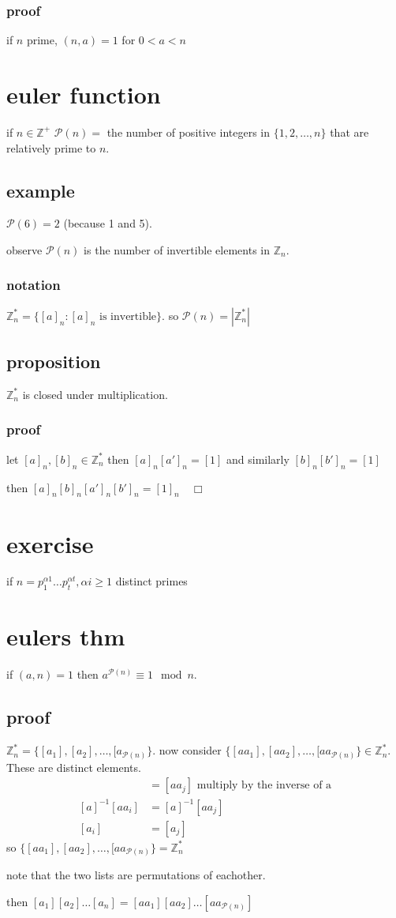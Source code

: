 \documentclass[letterpaper]{article}
\begin{document}
\subsubsection*{proof}
if $n$ prime, $(n,a)=1$ for $0<a<n$
\section*{euler function}
if $n\in\mathbb{Z}^+$ $\mathcal{P}(n)=$ the number of positive integers in $\{1,2,\dots,n\}$ that are relatively prime to $n$.
\subsection*{example}
$\mathcal{P}(6)=2$ (because 1 and 5).

observe $\mathcal{P}(n)$ is the number of invertible elements in $\mathbb{Z}_n$.
\subsubsection*{notation}
$\mathbb{Z}_n^*=\{[a]_n:[a]_n\text{ is invertible}\}$. so $\mathcal{P}(n)=|\mathbb{Z}_n^*|$
\subsection*{proposition}
$\mathbb{Z}_n^*$ is closed under multiplication.
\subsubsection*{proof}
let $[a]_n,[b]_n\in\mathbb{Z}_n^*$ then $[a]_n[a']_n=[1]$ and similarly $[b]_n[b']_n=[1]$

then $[a]_n[b]_n[a']_n[b']_n=[1]_n\quad\Box$
\section*{exercise}
if $n=p_1^{\alpha1}\dots p_t^{\alpha t},\alpha i\ge1$ distinct primes

\section*{eulers thm}
if $(a,n)=1$ then $a^{\mathcal{P}(n)}\equiv 1\mod n$.
\subsection*{proof}
$\mathbb{Z}_n^*=\{[a_1],[a_2],\dots,[a_{\mathcal{P}(n)}\}$. now consider $\{[aa_1],[aa_2],\dots,[aa_{\mathcal{P}(n)}\}\in\mathbb{Z}_n^*$. These are distinct elements.
\begin{align*}
  [aa_i]&=[aa_j]\text{ multiply by the inverse of a}\\
  [a]^{-1}[aa_i]&=[a]^{-1}[aa_j]\\
  [a_i]&=[a_j]
\end{align*}
so $\{[aa_1],[aa_2],\dots,[aa_{\mathcal{P}(n)}\}=\mathbb{Z}_n^*$

note that the two lists are permutations of eachother.

then $[a_1][a_2]\dots[a_n]=[aa_1][aa_2]\dots[aa_{\mathcal{P}(n)}]$
\end{document}
